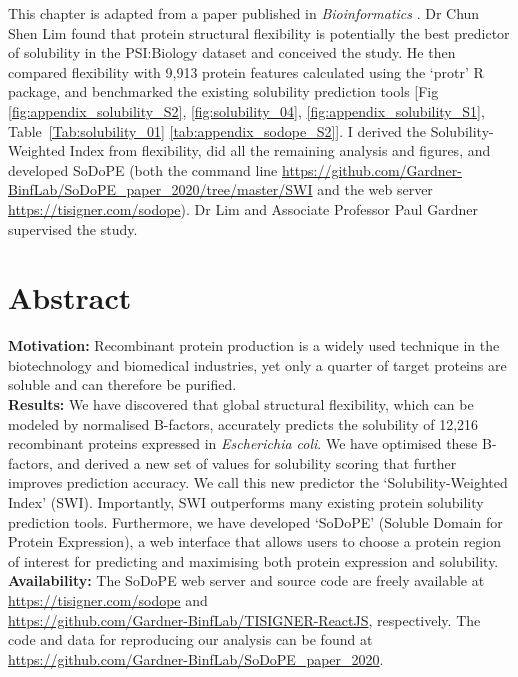 This chapter is adapted from a paper published in \textit{Bioinformatics} \cite{Bhandari2020-pz}. Dr Chun Shen Lim found that protein structural flexibility is potentially the best predictor of solubility in the PSI:Biology dataset and conceived the study. He then compared flexibility with 9,913 protein features calculated using the ‘protr’ R package, and benchmarked the existing solubility prediction tools [Fig \ref{fig:appendix_solubility_S2}, \ref{fig:solubility_04},  \ref{fig:appendix_solubility_S1}, Table~\ref{Tab:solubility_01} \ref{tab:appendix_sodope_S2}]. I derived the Solubility-Weighted Index from flexibility, did all the remaining analysis and figures, and developed SoDoPE (both the command line \href{https://github.com/Gardner-BinfLab/SoDoPE\_paper\_2020/tree/master/SWI}{https://github.com/Gardner-BinfLab/SoDoPE\_paper\_2020/tree/master/SWI} and the web server \href{https://tisigner.com/sodope}{https://tisigner.com/sodope}). Dr Lim and Associate Professor Paul Gardner supervised the study.


\section{Abstract}
\textbf{Motivation:} Recombinant protein production is a widely used technique in the biotechnology and biomedical industries, yet only a quarter of target proteins are soluble and can therefore be purified.\\
\textbf{Results:} We have discovered that global structural flexibility, which can be modeled by normalised B-factors, accurately predicts the solubility of 12,216 recombinant proteins expressed in \textit{Escherichia coli}. We have optimised these B-factors, and derived a new set of values for solubility scoring that further improves prediction accuracy. We call this new predictor the ‘Solubility-Weighted Index’ (SWI). Importantly, SWI outperforms many existing protein solubility prediction tools. Furthermore, we have developed ‘SoDoPE’ (Soluble Domain for Protein Expression), a web interface that allows users to choose a protein region of interest for predicting and maximising both protein expression and solubility.\\
\textbf{Availability:} The SoDoPE web server and source code are freely available at\\ \href{https://tisigner.com/sodope}{https://tisigner.com/sodope} and \\ \href{https://github.com/Gardner-BinfLab/TISIGNER-ReactJS}{https://github.com/Gardner-BinfLab/TISIGNER-ReactJS}, respectively.
The code and data for reproducing our analysis can be found at\\ \href{https://github.com/Gardner-BinfLab/SoDoPE\_paper\_2020}{https://github.com/Gardner-BinfLab/SoDoPE\_paper\_2020}.\\


